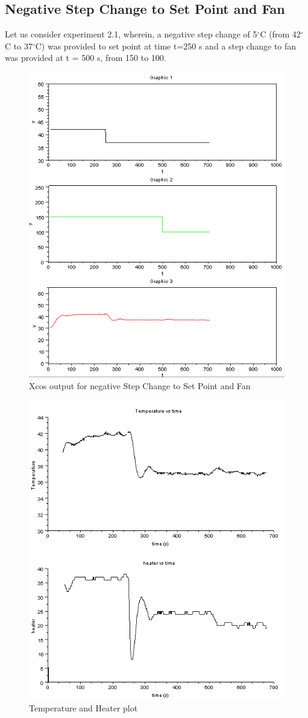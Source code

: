 \subsection{Negative Step Change to Set Point and Fan}
Let us consider experiment 2.1, wherein, a negative step change of 5$^\circ$C (from 42$^\circ$C to 37$^\circ$C) was provided to set point at time t=250 s and a step change to fan was provided at t = 500 s, from 150 to 100. 
\begin{figure}[H]
\centering
  \includegraphics[width=0.8\linewidth]{mpc/2_1.PNG}
  \caption{Xcos output for negative Step Change to Set Point and Fan}
\end{figure}
\begin{figure}[H]
\centering
  \includegraphics[width=0.8\linewidth]{mpc/2_1_heater_final.png}
  \caption{Temperature and Heater plot}
\end{figure}
